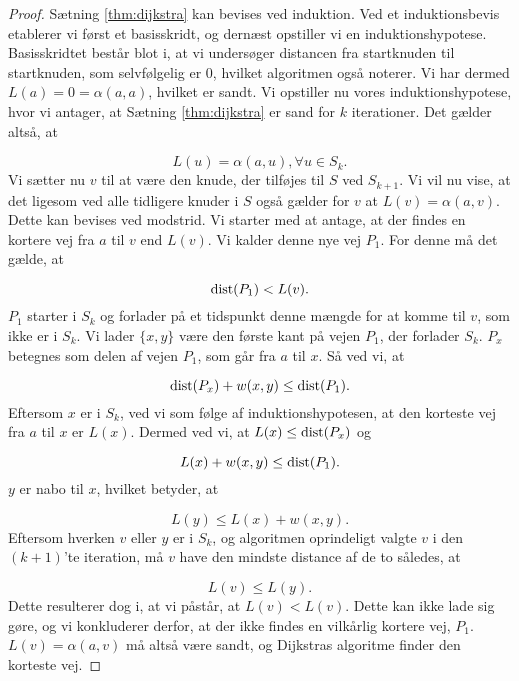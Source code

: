 \begin{proof}
Sætning \ref{thm:dijkstra} kan bevises ved induktion. Ved et induktionsbevis etablerer vi først et basisskridt, og dernæst opstiller vi en induktionshypotese. Basisskridtet består blot i, at vi undersøger distancen fra startknuden til startknuden, som selvfølgelig er 0, hvilket algoritmen også noterer. Vi har dermed $L(a)=0= \alpha(a,a)$, hvilket er sandt.
Vi opstiller nu vores induktionshypotese, hvor vi antager, at Sætning \ref{thm:dijkstra} er sand for $k$ iterationer. Det gælder altså, at

\begin{equation}
L(u) = \alpha(a,u), \forall u \in S_k. 
\end{equation} %
Vi sætter nu $v$ til at være den knude, der tilføjes til $S$ ved $S_{k+1}$. Vi vil nu vise, at det ligesom ved alle tidligere knuder i $S$ også gælder for $v$ at $L(v)=\alpha(a,v)$. Dette kan bevises ved modstrid. Vi starter med at antage, at der findes en kortere vej fra $a$ til $v$ end $L(v)$. Vi kalder denne nye vej $P_1$. For denne må det gælde, at

\begin{equation}
\textrm{dist}(P_1)<L(v).
\end{equation} %
$P_1$ starter i $S_k$ og forlader på et tidspunkt denne mængde for at komme til $v$, som ikke er i $S_k$. Vi lader $\{x,y\}$ være den første kant på vejen $P_1$, der forlader $S_k$. $P_x$ betegnes som delen af vejen $P_1$, som går fra $a$ til $x$. Så ved vi, at

\begin{equation}
\textrm{dist}(P_x)+w(x,y) \leq \textrm{dist}(P_1).
\end{equation}
Eftersom $x$ er i $S_k$, ved vi som følge af induktionshypotesen, at den korteste vej fra $a$ til $x$ er $L(x)$. Dermed ved vi, at $L(x) \leq \textrm{dist}(P_x)$ og

\begin{equation}
L(x) + w(x,y) \leq \textrm{dist}(P_1).
\end{equation}
$y$ er nabo til $x$, hvilket betyder, at

\begin{equation}
L(y) \leq L(x) + w(x,y).
\end{equation}
Eftersom hverken $v$ eller $y$ er i $S_k$, og algoritmen oprindeligt valgte $v$ i den $(k+1)$'te iteration, må $v$ have den mindste distance af de to således, at

\begin{equation}
L(v) \leq L(y).
\end{equation}
Dette resulterer dog i, at vi påstår, at $L(v) < L(v)$. Dette kan ikke lade sig gøre, og vi konkluderer derfor, at der ikke findes en vilkårlig kortere vej, $P_1$. $L(v)=\alpha(a,v)$ må altså være sandt, og Dijkstras algoritme finder den korteste vej.
\end{proof}
